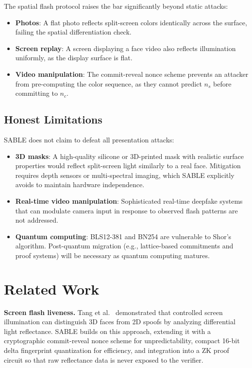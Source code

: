 \documentclass[conference]{IEEEtran}
\begin{document}
The spatial flash protocol raises the bar significantly beyond static attacks:

\begin{itemize}
\item \textbf{Photos}: A flat photo reflects split-screen colors identically across the surface, failing the spatial differentiation check.
\item \textbf{Screen replay}: A screen displaying a face video also reflects illumination uniformly, as the display surface is flat.
\item \textbf{Video manipulation}: The commit-reveal nonce scheme prevents an attacker from pre-computing the color sequence, as they cannot predict $n_s$ before committing to $n_c$.
\end{itemize}

\subsection{Honest Limitations}

SABLE does not claim to defeat all presentation attacks:

\begin{itemize}
\item \textbf{3D masks}: A high-quality silicone or 3D-printed mask with realistic surface properties would reflect split-screen light similarly to a real face. Mitigation requires depth sensors or multi-spectral imaging, which SABLE explicitly avoids to maintain hardware independence.
\item \textbf{Real-time video manipulation}: Sophisticated real-time deepfake systems that can modulate camera input in response to observed flash patterns are not addressed.
\item \textbf{Quantum computing}: BLS12-381 and BN254 are vulnerable to Shor's algorithm. Post-quantum migration (e.g., lattice-based commitments and proof systems) will be necessary as quantum computing matures.
\end{itemize}

\section{Related Work}
\label{sec:related}

\textbf{Screen flash liveness.} Tang et al.~\cite{tang2018} demonstrated that controlled screen illumination can distinguish 3D faces from 2D spoofs by analyzing differential light reflectance. SABLE builds on this approach, extending it with a cryptographic commit-reveal nonce scheme for unpredictability, compact 16-bit delta fingerprint quantization for efficiency, and integration into a ZK proof circuit so that raw reflectance data is never exposed to the verifier.
\end{document}
